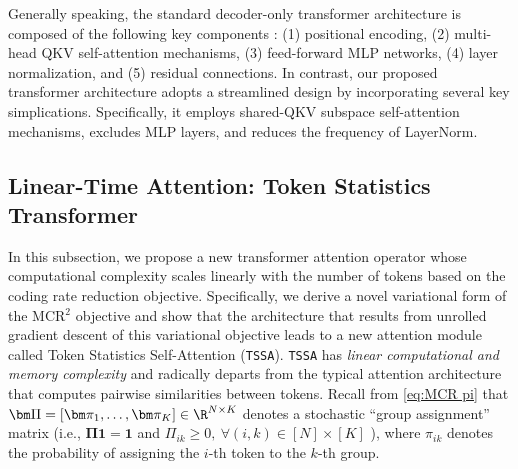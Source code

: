 \documentclass[../../book-main.tex]{subfiles}
\begin{document}
Generally speaking, the standard decoder-only transformer architecture is composed of the following key components \cite{vaswani2017attention}: (1)  positional encoding, (2) multi-head QKV self-attention mechanisms, (3) feed-forward MLP networks, (4) layer normalization, and (5) residual connections. In contrast, our proposed transformer architecture adopts a streamlined design by incorporating several key simplications. Specifically, it employs shared-QKV subspace self-attention mechanisms, excludes MLP layers, and reduces the frequency of LayerNorm.










\subsection{Linear-Time Attention: Token Statistics Transformer}\label{sub:tost} 

In this subsection, we propose a new transformer attention operator whose computational complexity scales linearly with the number of tokens based on the coding rate reduction objective.  Specifically, we derive a novel variational form of the MCR$^2$ objective and show that the architecture that results from unrolled gradient descent of this variational objective leads to a new attention module called Token Statistics Self-Attention (\texttt{TSSA}). \texttt{TSSA} has {\em linear computational and memory complexity} and radically departs from the typical attention architecture that computes pairwise similarities between tokens.  Recall from \eqref{eq:MCR pi} that $\bm \Pi = [\bm \pi_1, \ldots, \bm \pi_K] \in \R^{N \times K}$ denotes a stochastic ``group assignment'' matrix (i.e., $\bm \Pi \bm 1 = \bm 1$ and $\Pi_{ik} \geq 0, \  \forall (i,k) \in [N] \times [K]$ ), where $\pi_{ik}$ denotes the probability of assigning the $i$-th token to the $k$-th group. 
\end{document}
